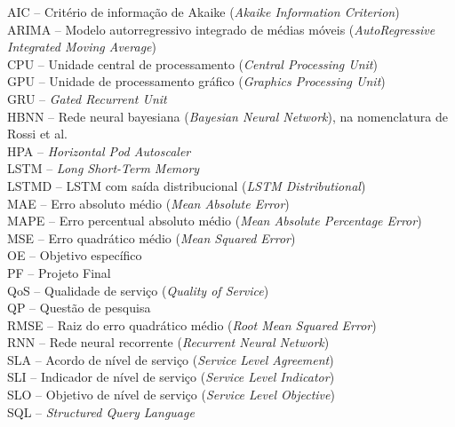 \noindent \doublespacing
AIC -- Critério de informação de Akaike (\textit{Akaike Information Criterion})\\
ARIMA -- Modelo autorregressivo integrado de médias móveis (\textit{AutoRegressive Integrated Moving Average})\\
CPU -- Unidade central de processamento (\textit{Central Processing Unit})\\
GPU -- Unidade de processamento gráfico (\textit{Graphics Processing Unit})\\
GRU -- \textit{Gated Recurrent Unit}\\
HBNN -- Rede neural bayesiana (\textit{Bayesian Neural Network}), na nomenclatura de Rossi et al.\\
HPA -- \textit{Horizontal Pod Autoscaler}\\
LSTM -- \textit{Long Short-Term Memory}\\
LSTMD -- LSTM com saída distribucional (\textit{LSTM Distributional})\\
MAE -- Erro absoluto médio (\textit{Mean Absolute Error})\\
MAPE -- Erro percentual absoluto médio (\textit{Mean Absolute Percentage Error})\\
MSE -- Erro quadrático médio (\textit{Mean Squared Error})\\
OE -- Objetivo específico\\
PF -- Projeto Final\\
QoS -- Qualidade de serviço (\textit{Quality of Service})\\
QP -- Questão de pesquisa\\
RMSE -- Raiz do erro quadrático médio (\textit{Root Mean Squared Error})\\
RNN -- Rede neural recorrente (\textit{Recurrent Neural Network})\\
SLA -- Acordo de nível de serviço (\textit{Service Level Agreement})\\
SLI -- Indicador de nível de serviço (\textit{Service Level Indicator})\\
SLO -- Objetivo de nível de serviço (\textit{Service Level Objective})\\
SQL -- \textit{Structured Query Language}
